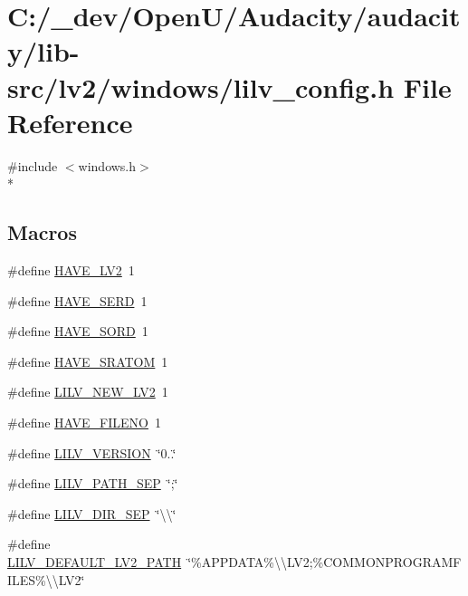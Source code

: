 \hypertarget{lib-src_2lv2_2windows_2lilv__config_8h}{}\section{C\+:/\+\_\+dev/\+Open\+U/\+Audacity/audacity/lib-\/src/lv2/windows/lilv\+\_\+config.h File Reference}
\label{lib-src_2lv2_2windows_2lilv__config_8h}
{\ttfamily \#include $<$windows.\+h$>$}\\*
\subsection*{Macros}
\begin{DoxyCompactItemize}
\item 
\#define \hyperlink{lib-src_2lv2_2windows_2lilv__config_8h_a3377686d402043f36819f446ef0e0edd}{H\+A\+V\+E\+\_\+\+L\+V2}~1
\item 
\#define \hyperlink{lib-src_2lv2_2windows_2lilv__config_8h_af73dc1c61a8c088c96f3a0f3a85b75dd}{H\+A\+V\+E\+\_\+\+S\+E\+RD}~1
\item 
\#define \hyperlink{lib-src_2lv2_2windows_2lilv__config_8h_a49c11735861a0675e6a29e557c574eab}{H\+A\+V\+E\+\_\+\+S\+O\+RD}~1
\item 
\#define \hyperlink{lib-src_2lv2_2windows_2lilv__config_8h_a91813cd212335e12e385f5197134a136}{H\+A\+V\+E\+\_\+\+S\+R\+A\+T\+OM}~1
\item 
\#define \hyperlink{lib-src_2lv2_2windows_2lilv__config_8h_af0100814b9a792698841cf0a8ffbcf56}{L\+I\+L\+V\+\_\+\+N\+E\+W\+\_\+\+L\+V2}~1
\item 
\#define \hyperlink{lib-src_2lv2_2windows_2lilv__config_8h_acbc37357ec546ab973057c6a8fa96a67}{H\+A\+V\+E\+\_\+\+F\+I\+L\+E\+NO}~1
\item 
\#define \hyperlink{lib-src_2lv2_2windows_2lilv__config_8h_a3f20e0a84489663e26aa644e2bae4c19}{L\+I\+L\+V\+\_\+\+V\+E\+R\+S\+I\+ON}~\char`\"{}0..\char`\"{}
\item 
\#define \hyperlink{lib-src_2lv2_2windows_2lilv__config_8h_a4ae8b5357794ac90229532569f0acc86}{L\+I\+L\+V\+\_\+\+P\+A\+T\+H\+\_\+\+S\+EP}~\char`\"{};\char`\"{}
\item 
\#define \hyperlink{lib-src_2lv2_2windows_2lilv__config_8h_aaa0ba9f096da7391eb54ba228e47907a}{L\+I\+L\+V\+\_\+\+D\+I\+R\+\_\+\+S\+EP}~\char`\"{}\textbackslash{}\textbackslash{}\char`\"{}
\item 
\#define \hyperlink{lib-src_2lv2_2windows_2lilv__config_8h_adce8861513530872156c039fb0b92e45}{L\+I\+L\+V\+\_\+\+D\+E\+F\+A\+U\+L\+T\+\_\+\+L\+V2\+\_\+\+P\+A\+TH}~\char`\"{}\%A\+P\+P\+D\+A\+TA\%\textbackslash{}\textbackslash{}L\+V2;\%C\+O\+M\+M\+O\+N\+P\+R\+O\+G\+R\+A\+M\+F\+I\+L\+ES\%\textbackslash{}\textbackslash{}L\+V2\char`\"{}
\end{DoxyCompactItemize}

